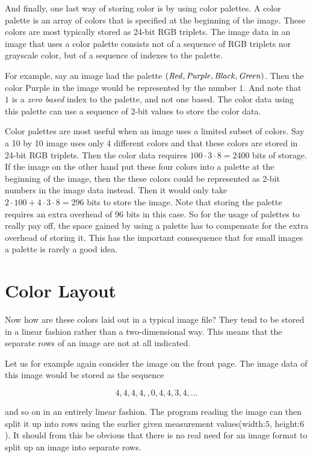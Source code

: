 And finally, one last way of storing color is by using color
palettes. A color palette is an array of colors that is specified at
the beginning of the image. These colors are most typically stored as
24-bit RGB triplets. The image data in an image that uses a color
palette consists not of a sequence of RGB triplets nor grayscale
color, but of a sequence of indexes to the palette.

For example, say an image had the palette $(\mathit{Red}, \mathit{Purple}, \mathit{Black},
\mathit{Green})$. Then the color Purple in the image would be represented by
the number $1$. And note that $1$ is a \textit{zero based} index to
the palette, and not one based. The color data using this palette can
use a sequence of 2-bit values to store the color data.

Color palettes are most useful when an image uses a limited subset of
colors. Say a 10 by 10 image uses only 4 different colors and that
these colors are stored in 24-bit RGB triplets. Then the color data
requires $100 \cdot 3 \cdot 8 = 2400$ bits of storage. If the image on
the other hand put these four colors into a palette at the beginning
of the image, then the these colors could be represented as 2-bit
numbers in the image data instead. Then it would only take $2 \cdot
100 + 4 \cdot 3 \cdot 8 = 296$ bits to store the image. Note that
storing the palette requires an extra overhead of $96$ bits in this
case. So for the usage of palettes to really pay off, the space gained
by using a palette has to compensate for the extra overhead of storing
it. This has the important consequence that for small images a palette
is rarely a good idea.

\section{Color Layout}
\label{sec:color-layout}

Now how are these colors laid out in a typical image file? They tend
to be stored in a linear fashion rather than a two-dimensional
way. This means that the separate rows of an image are not at all
indicated.

Let us for example again consider the image on the front page. The
image data of this image would be stored as the sequence

\begin{equation*}
  4,4,4,4,,0,4,4,3,4,\dots
\end{equation*}

and so on in an entirely linear fashion. The program reading the image
can then split it up into rows using the earlier given measurement
values(width:$5$, height:$6$). It should from this be obvious that
there is no real need for an image format to split up an image into
separate rows.

